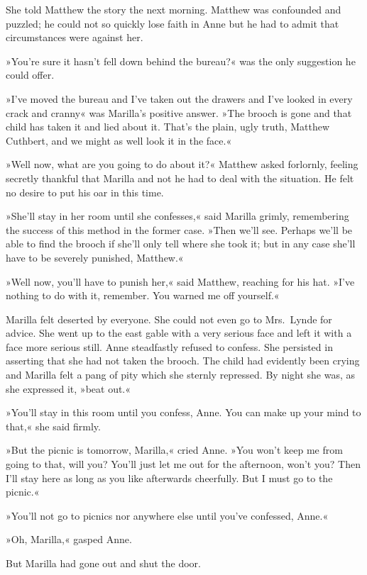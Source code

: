 She told Matthew the story the next morning. Matthew was confounded and puzzled; he could not so quickly lose faith in Anne but he had to admit that circumstances were against her.

»You're sure it hasn't fell down behind the bureau?« was the only suggestion he could offer.

»I've moved the bureau and I've taken out the drawers and I've looked in every crack and cranny« was Marilla's positive answer. »The brooch is gone and that child has taken it and lied about it. That's the plain, ugly truth, Matthew Cuthbert, and we might as well look it in the face.«

»Well now, what are you going to do about it?« Matthew asked forlornly, feeling secretly thankful that Marilla and not he had to deal with the situation. He felt no desire to put his oar in this time.

»She'll stay in her room until she confesses,« said Marilla grimly, remembering the success of this method in the former case. »Then we'll see. Perhaps we'll be able to find the brooch if she'll only tell where she took it; but in any case she'll have to be severely punished, Matthew.«

»Well now, you'll have to punish her,« said Matthew, reaching for his hat. »I've nothing to do with it, remember. You warned me off yourself.«

Marilla felt deserted by everyone. She could not even go to Mrs.~Lynde for advice. She went up to the east gable with a very serious face and left it with a face more serious still. Anne steadfastly refused to confess. She persisted in asserting that she had not taken the brooch. The child had evidently been crying and Marilla felt a pang of pity which she sternly repressed. By night she was, as she expressed it, »beat out.«

»You'll stay in this room until you confess, Anne. You can make up your mind to that,« she said firmly.

»But the picnic is tomorrow, Marilla,« cried Anne. »You won't keep me from going to that, will you? You'll just let me out for the afternoon, won't you? Then I'll stay here as long as you like afterwards cheerfully. But I must go to the picnic.«

»You'll not go to picnics nor anywhere else until you've confessed, Anne.«

»Oh, Marilla,« gasped Anne.

But Marilla had gone out and shut the door.


